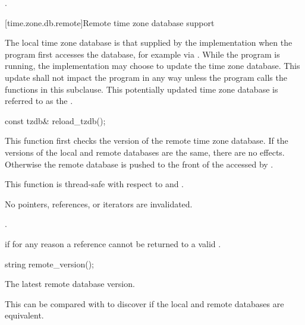 \begin{itemdescr}
\pnum
\returns
{}.
\end{itemdescr}

[time.zone.db.remote]{Remote time zone database support}

\pnum
The local time zone database
is that supplied by the implementation
when the program first accesses the database,
for example via .
While the program is running,
the implementation may choose to update the time zone database.
This update shall not impact the program in any way
unless the program calls the functions in this subclause.
This potentially updated time zone database
is referred to as the .

%
\begin{itemdecl}
const tzdb& reload_tzdb();
\end{itemdecl}

\begin{itemdescr}
\pnum
\effects
This function first checks
the version of the remote time zone database.
If the versions of the local and remote databases are the same,
there are no effects.
Otherwise the remote database is pushed
to the front of the 
accessed by .

\pnum
\sync
This function is thread-safe with respect to
 and .

\pnum
\ensures
No pointers, references, or iterators are invalidated.

\pnum
\returns
{}.

\pnum
\throws
{} if for any reason
a reference cannot be returned to a valid .
\end{itemdescr}

%
\begin{itemdecl}
string remote_version();
\end{itemdecl}

\begin{itemdescr}
\pnum
\returns
The latest remote database version.

\begin{note}
This can be compared with 
to discover if the local and remote databases are equivalent.
\end{note}
\end{itemdescr}

